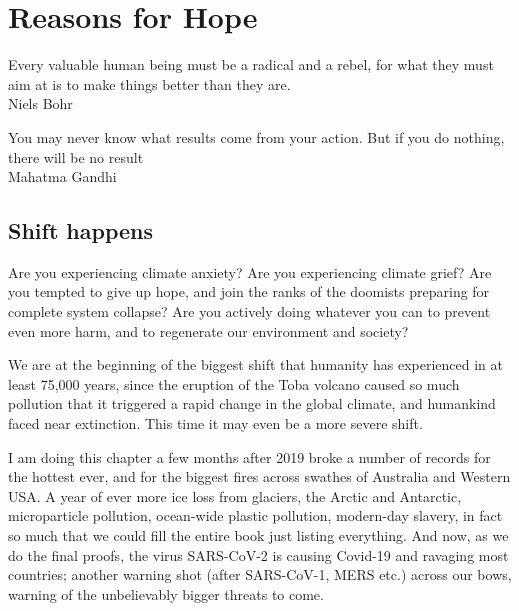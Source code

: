 ﻿\chapter{Reasons for Hope}
\label{chapter:reasons-for-hope}


\begin{chapterquotation}
Every valuable human being must be a radical and a rebel, for what they must aim at is to make things better than they are.\\
\raggedleft\textemdash Niels Bohr\cite{bohr-radical}


\centering
You may never know what results come from your action. But if you do nothing, there will be no result\\
\raggedleft\textemdash Mahatma Gandhi
\end{chapterquotation}


\section{Shift happens}
Are you experiencing climate anxiety? Are you experiencing climate grief? Are you tempted to give up hope, and join the ranks of the doomists preparing for complete system collapse? Are you actively doing whatever you can to prevent even more harm, and to regenerate our environment and society?


We are at the beginning of the biggest shift   that humanity has experienced in at least 75,000 years, since the eruption of the Toba volcano caused so much pollution that it triggered a rapid change in the global climate, and humankind faced near extinction. This time it may even be a more severe shift.


I am doing this chapter a few months after 2019 broke a number of records for the hottest ever, and for the biggest fires across swathes of Australia and Western USA. A year of ever more ice loss from glaciers, the Arctic and Antarctic, microparticle pollution, ocean-wide plastic pollution, modern-day slavery, in fact so much that we could fill the entire book just listing everything. And now, as we do the final proofs, the virus SARS-CoV-2 is causing Covid-19 and ravaging most countries; another warning shot (after SARS-CoV-1, MERS etc.) across our bows, warning of the unbelievably bigger threats to come.


